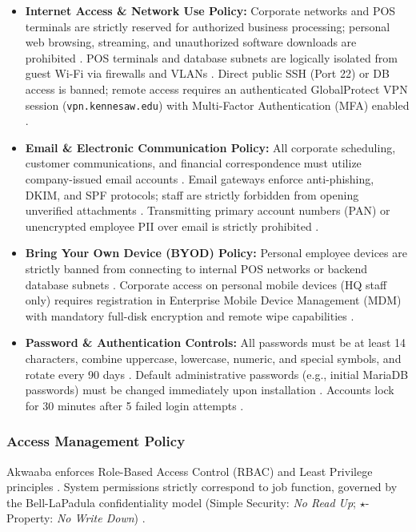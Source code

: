 \documentclass[10pt,a4paper]{article}
\begin{document}
\begin{itemize}[leftmargin=*]
    \item \textbf{Internet Access \& Network Use Policy:} Corporate networks and POS terminals are strictly reserved for authorized business processing; personal web browsing, streaming, and unauthorized software downloads are prohibited \cite{Phase1Guide, LiISP}. POS terminals and database subnets are logically isolated from guest Wi-Fi via firewalls and VLANs \cite{AkwaabaConfig, Phase1Guide}. Direct public SSH (Port 22) or DB access is banned; remote access requires an authenticated GlobalProtect VPN session (\texttt{vpn.kennesaw.edu}) with Multi-Factor Authentication (MFA) enabled \cite{VMConnect, Phase1Guide}.
    \item \textbf{Email \& Electronic Communication Policy:} All corporate scheduling, customer communications, and financial correspondence must utilize company-issued email accounts \cite{Phase1Guide, LiISP}. Email gateways enforce anti-phishing, DKIM, and SPF protocols; staff are strictly forbidden from opening unverified attachments \cite{Phase1Guide, LiISP}. Transmitting primary account numbers (PAN) or unencrypted employee PII over email is strictly prohibited \cite{Phase1Guide, LiISP}.
    \item \textbf{Bring Your Own Device (BYOD) Policy:} Personal employee devices are strictly banned from connecting to internal POS networks or backend database subnets \cite{AkwaabaConfig, Phase1Guide}. Corporate access on personal mobile devices (HQ staff only) requires registration in Enterprise Mobile Device Management (MDM) with mandatory full-disk encryption and remote wipe capabilities \cite{Phase1Guide}.
    \item \textbf{Password \& Authentication Controls:} All passwords must be at least 14 characters, combine uppercase, lowercase, numeric, and special symbols, and rotate every 90 days \cite{Phase1Guide}. Default administrative passwords (e.g., initial MariaDB passwords) must be changed immediately upon installation \cite{AkwaabaConfig, Phase1Guide}. Accounts lock for 30 minutes after 5 failed login attempts \cite{Phase1Guide}.
\end{itemize}

\subsubsection{Access Management Policy}
Akwaaba enforces Role-Based Access Control (RBAC) and Least Privilege principles \cite{Phase1Guide, LiISP}. System permissions strictly correspond to job function, governed by the Bell-LaPadula confidentiality model (Simple Security: \textit{No Read Up}; $\star$-Property: \textit{No Write Down}) \cite{LiISP}.
\end{document}
